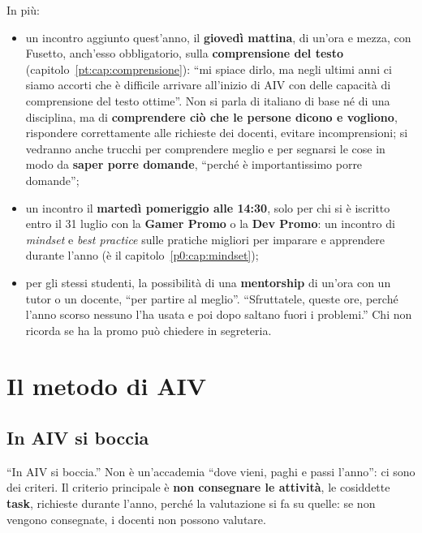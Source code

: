 In più:
\begin{itemize}
  \item un incontro aggiunto quest'anno, il \textbf{giovedì mattina}, di
        un'ora e mezza, con Fusetto, anch'esso obbligatorio, sulla
        \textbf{comprensione del testo} (capitolo~\ref{pt:cap:comprensione}): ``mi spiace dirlo, ma negli ultimi
        anni ci siamo accorti che è difficile arrivare all'inizio di AIV con
        delle capacità di comprensione del testo ottime''. Non si parla di
        italiano di base né di una disciplina, ma di \textbf{comprendere
        ciò che le persone dicono e vogliono}, rispondere correttamente alle
        richieste dei docenti, evitare incomprensioni; si vedranno anche
        trucchi per comprendere meglio e per segnarsi le cose in modo da
        \textbf{saper porre domande}, ``perché è importantissimo porre
        domande'';
  \item un incontro il \textbf{martedì pomeriggio alle 14:30}, solo per chi
        si è iscritto entro il 31 luglio con la \textbf{Gamer Promo} o la
        \textbf{Dev Promo}: un incontro di \emph{mindset} e \emph{best
        practice} sulle pratiche migliori per imparare e apprendere
        durante l'anno (è il capitolo~\ref{p0:cap:mindset});
  \item per gli stessi studenti, la possibilità di una
        \textbf{mentorship} di un'ora con un tutor o un docente, ``per
        partire al meglio''. ``Sfruttatele, queste ore, perché l'anno scorso
        nessuno l'ha usata e poi dopo saltano fuori i problemi.'' Chi non
        ricorda se ha la promo può chiedere in segreteria.
\end{itemize}

\section{Il metodo di AIV}
\label{p1:sec:metodo}

\subsection{In AIV si boccia}

``In AIV si boccia.'' Non è un'accademia ``dove vieni, paghi e passi
l'anno'': ci sono dei criteri. Il criterio principale è \textbf{non
consegnare le attività}, le cosiddette \textbf{task}, richieste durante
l'anno, perché la valutazione si fa su quelle: se non vengono consegnate, i
docenti non possono valutare.

